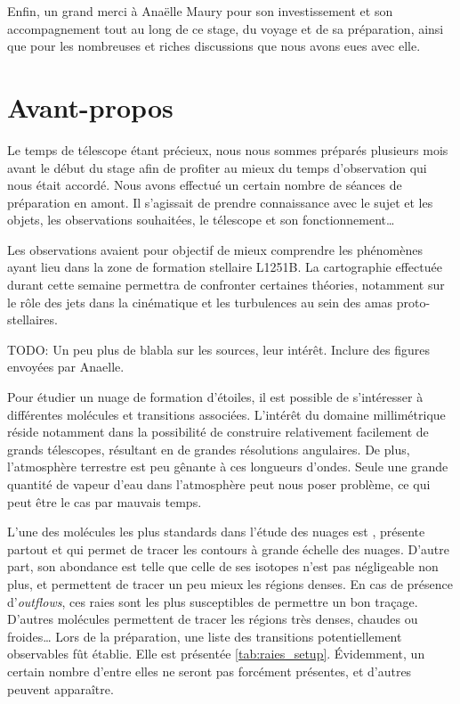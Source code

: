 \documentclass[a4paper,10pt,french]{article}
\begin{document}
Enfin, un grand merci à Anaëlle Maury pour son investissement et son
accompagnement tout au long de ce stage, du voyage et de sa préparation, ainsi
que pour les nombreuses et riches discussions que nous avons eues avec elle.

\tableofcontents

\newpage


\setlength{\parindent}{16pt}
\setlength{\parskip}{1ex}

\section{Avant-propos}

Le temps de télescope étant précieux, nous nous sommes préparés plusieurs mois
avant le début du stage afin de profiter au mieux du temps d’observation qui
nous était accordé. Nous avons effectué un certain nombre de séances de
préparation en amont. Il s’agissait de prendre connaissance avec le sujet et
les objets, les observations souhaitées, le télescope et son fonctionnement…

Les observations avaient pour objectif de mieux comprendre les phénomènes ayant
lieu dans la zone de formation stellaire L1251B. La cartographie effectuée
durant cette semaine permettra de confronter certaines théories, notamment sur
le rôle des jets dans la cinématique et les turbulences au sein des amas
proto-stellaires.

TODO: Un peu plus de blabla sur les sources, leur intérêt. Inclure des figures
envoyées par Anaelle.

Pour étudier un nuage de formation d’étoiles, il est possible de s’intéresser à
différentes molécules et transitions associées. L’intérêt du domaine
millimétrique réside notamment dans la possibilité de construire relativement
facilement de grands télescopes, résultant en de grandes résolutions
angulaires. De plus, l’atmosphère terrestre est peu gênante à ces longueurs
d’ondes. Seule une grande quantité de vapeur d’eau dans l’atmosphère peut nous
poser problème, ce qui peut être le cas par mauvais temps.

L’une des molécules les plus standards dans l’étude des nuages est ,
présente partout et qui permet de tracer les contours à grande échelle des
nuages. D’autre part, son abondance est telle que celle de ses isotopes n’est
pas négligeable non plus,  et  permettent de tracer un peu
mieux les régions denses. En cas de présence d’\textit{outflows}, ces raies
sont les plus susceptibles de permettre un bon traçage. D’autres molécules
permettent de tracer les régions très denses, chaudes ou froides… Lors de la
préparation, une liste des transitions potentiellement observables fût établie.
Elle est présentée \cref{tab:raies_setup}. Évidemment, un certain nombre
d’entre elles ne seront pas forcément présentes, et d’autres peuvent
apparaître.
\end{document}
